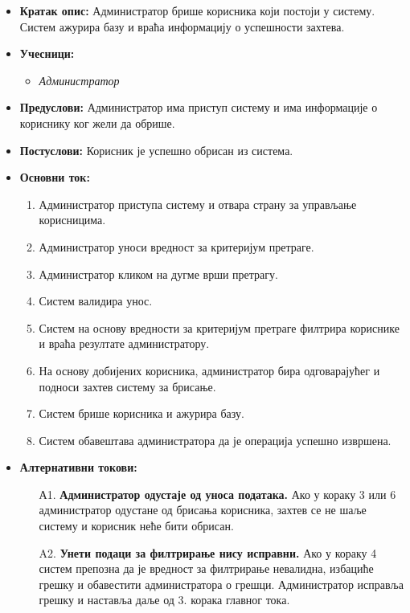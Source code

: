 \documentclass{article}
\begin{document}
\begin{itemize}
    \item \textbf{Кратак опис:} Администратор брише корисника који постоји у систему. Систем ажурира базу и враћа информацију о успешности захтева.
    \item \textbf{Учесници:}
        \begin{itemize}
            \item \textit{Администратор}
        \end{itemize}
    \item \textbf{Предуслови:} Администратор има приступ систему и има информације о кориснику ког жели да обрише.
    \item \textbf{Постуслови:} Корисник је успешно обрисан из система.
    \item \textbf{Основни ток:}
        \begin{enumerate}
            \item Администратор приступа систему и отвара страну за управљање корисницима.
            \item Администратор уноси вредност за критеријум претраге.
            \item Администратор кликом на дугме врши претрагу.
            \item Систем валидира унос.
            \item Систем на основу вредности за критеријум претраге филтрира кориснике и враћа резултате администратору.
            \item На основу добијених корисника, администратор бира одговарајућег и подноси захтев систему за брисање.
            \item Систем брише корисника и ажурира базу.
            \item Систем обавештава администратора да је операција успешно извршена.
        \end{enumerate}
    
    \item \textbf{Алтернативни токови:}
        \begin{itemize}
            \item[А1.] \textbf{Администратор одустаје од уноса података.} Ако у кораку 3 или 6 администратор одустане од брисања корисника, захтев се не шаље систему и корисник неће бити обрисан.
            \item[A2.] \textbf{Унети подаци за филтрирање нису исправни.} Ако у кораку 4 систем препозна да је вредност за филтрирање невалидна, избациће грешку и обавестити администратора о грешци. Администратор исправља грешку и наставља даље од 3. корака главног тока. 
        \end{itemize}
\end{itemize}
\end{document}
